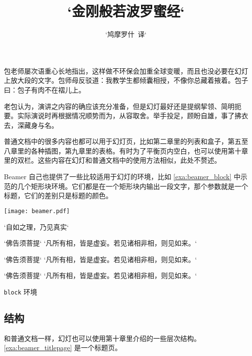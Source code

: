 包老师屡次语重心长地指出，这样做不环保会加重全球变暖，而且也没必要在幻灯上放大段的文字。包师母反驳道：我教学生都倾囊相授，不像你总藏着掖着。包子曰：包子有肉不在褶儿上。

老包认为，演讲之内容的确应该充分准备，但是幻灯最好还是提纲挈领、简明扼要。实际演说时再根据情况顺势而为，从容取舍。举手投足，顾盼自雄，事了拂衣去，深藏身与名。

普通文档中的很多内容也都可以用于幻灯页，比如第二章里的列表和盒子，第五至八章里的各种插图，第九章里的表格。有时为了平衡页内空白，也可以使用第十章里的双栏。这些内容在幻灯和普通文档中的使用方法相似，此处不赘述。

Beamer 自己也提供了一些比较适用于幻灯的环境，比如 \autoref{exa:beamer_block} 中示范的几个矩形块环境。它们都是在一个矩形块内输出一段文字，那个参数就是一个标题，它们的差别只是标题的颜色。

\begin{example}[h]
\begin{FBTDemo}[numbers=left]{
\centering
\texttt{[image: beamer.pdf]}
}
\begin{frame}{`自如之理，乃见真实`}
\begin{block}{`佛告须菩提`}
`凡所有相，皆是虚妄。若见诸相非相，则见如来。`
\end{block}
\begin{alertblock}{`佛告须菩提`}
`凡所有相，皆是虚妄。若见诸相非相，则见如来。`
\end{alertblock}
\begin{exampleblock}{`佛告须菩提`}
`凡所有相，皆是虚妄。若见诸相非相，则见如来。`
\end{exampleblock}
\end{frame}
\end{FBTDemo}
\caption{\texttt{block} 环境}
\label{exa:beamer_block}
\end{example}

\subsection{结构}

和普通文档一样，幻灯也可以使用第十章里介绍的一些层次结构。\autoref{exa:beamer_titlepage} 是一个标题页。 

\begin{Code}[]
\begin{frame}
\title{`金刚般若波罗蜜经`}
\author{`鸠摩罗什\ 译`}
\date{}
\maketitle
\end{frame}
\end{Code}

